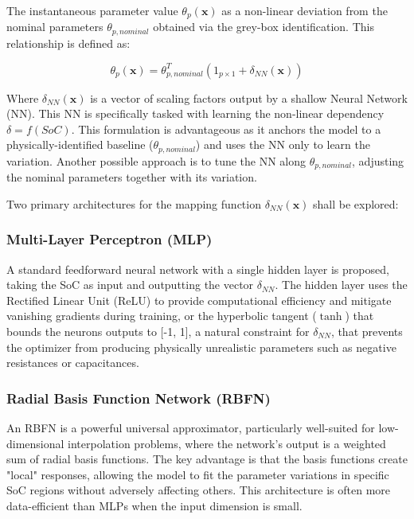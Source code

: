 \documentclass[lettersize,journal]{IEEEtran}
\begin{document}
The instantaneous parameter value $\theta_p(\mathbf{x})$ as a non-linear deviation from the nominal parameters $\theta_{p, nominal}$ obtained via the grey-box identification. This relationship is defined as:

\begin{equation}
	\label{eq:lpv_param}
	\theta_p(\mathbf{x}) = \theta_{p, nominal}^T(1_{p\times 1} + \delta_{NN}(\mathbf{x}))
\end{equation}

Where $\delta_{NN}(\mathbf{x})$ is a vector of scaling factors output by a shallow Neural Network (NN). This NN is specifically tasked with learning the non-linear dependency $\delta = f(SoC)$. This formulation is advantageous as it anchors the model to a physically-identified baseline ($\theta_{p, nominal}$) and uses the NN only to learn the variation. Another possible approach is to tune the NN along $\theta_{p, nominal}$, adjusting the nominal parameters together with its variation.

Two primary architectures for the mapping function $\delta_{NN}(\mathbf{x})$ shall be explored:

\subsubsection{Multi-Layer Perceptron (MLP)}

A standard feedforward neural network with a single hidden layer is proposed, taking the SoC as input and outputting the vector $\delta_{NN}$. The hidden layer uses the Rectified Linear Unit (ReLU) to provide computational efficiency and mitigate vanishing gradients during training, or the hyperbolic tangent ($\tanh$) that bounds the neurons outputs to [-1, 1], a natural constraint for $\delta_{NN}$, that prevents the optimizer from producing physically unrealistic parameters such as negative resistances or capacitances.

\subsubsection{Radial Basis Function Network (RBFN)}

An RBFN is a powerful universal approximator, particularly well-suited for low-dimensional interpolation problems\cite{broomhead1988radial}, where the network's output is a weighted sum of radial basis functions. The key advantage is that the basis functions create "local" responses, allowing the model to fit the parameter variations in specific SoC regions without adversely affecting others. This architecture is often more data-efficient than MLPs when the input dimension is small\cite{broomhead1988radial}.
\end{document}
